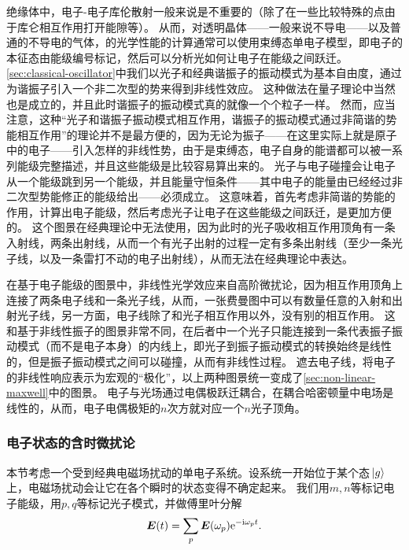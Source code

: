 绝缘体中，电子-电子库伦散射一般来说是不重要的（除了在一些比较特殊的点由于库仑相互作用打开能隙等）。
从而，对透明晶体——一般来说不导电——以及普通的不导电的气体，的光学性能的计算通常可以使用束缚态单电子模型，即电子的本征态由能级编号标记，然后可以分析光如何让电子在能级之间跃迁。
\autoref{sec:classical-oscillator}中我们以光子和经典谐振子的振动模式为基本自由度，通过为谐振子引入一个非二次型的势来得到非线性效应。
这种做法在量子理论中当然也是成立的，并且此时谐振子的振动模式真的就像一个个粒子一样。
然而，应当注意，这种“光子和谐振子振动模式相互作用，谐振子的振动模式通过非简谐的势能相互作用”的理论并不是最方便的，因为无论为振子——在这里实际上就是原子中的电子——引入怎样的非线性势，由于是束缚态，电子自身的能谱都可以被一系列能级完整描述，并且这些能级是比较容易算出来的。
光子与电子碰撞会让电子从一个能级跳到另一个能级，并且能量守恒条件——其中电子的能量由已经经过非二次型势能修正的能级给出——必须成立。
这意味着，首先考虑非简谐的势能的作用，计算出电子能级，然后考虑光子让电子在这些能级之间跃迁，是更加方便的。
这个图景在经典理论中无法使用，因为此时的光子吸收相互作用顶角有一条入射线，两条出射线，从而一个有光子出射的过程一定有多条出射线（至少一条光子线，以及一条雷打不动的电子出射线），从而无法在经典理论中表达。

在基于电子能级的图景中，非线性光学效应来自高阶微扰论，因为相互作用顶角上连接了两条电子线和一条光子线，从而，一张费曼图中可以有数量任意的入射和出射光子线，另一方面，电子线除了和光子相互作用以外，没有别的相互作用。
这和基于非线性振子的图景非常不同，在后者中一个光子只能连接到一条代表振子振动模式（而不是电子本身）的内线上，即光子到振子振动模式的转换始终是线性的，但是振子振动模式之间可以碰撞，从而有非线性过程。
遮去电子线，将电子的非线性响应表示为宏观的“极化”，以上两种图景统一变成了\autoref{sec:non-linear-maxwell}中的图景。
电子与光场通过电偶极跃迁耦合，在耦合哈密顿量中电场是线性的，从而，电子电偶极矩的$n$次方就对应一个$n$光子顶角。

\subsubsection{电子状态的含时微扰论}

本节考虑一个受到经典电磁场扰动的单电子系统。设系统一开始位于某个态$\ket*{g}$上，电磁场扰动会让它在各个瞬时的状态变得不确定起来。
我们用$m, n$等标记电子能级，用$p, q$等标记光子模式，并做傅里叶分解
\begin{equation}
    \vb*{E}(t) = \sum_p \vb*{E}(\omega_p) \mathrm{e}^{- \mathrm{i} \omega_p t}.
\end{equation}


